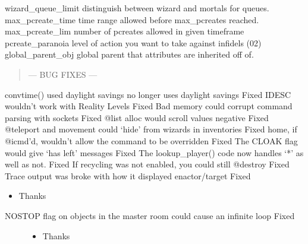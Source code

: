 \documentclass[letterpaper,10pt,english]{sphinxmanual}
\begin{document}
\sphinxAtStartPar
wizard\_queue\_limit \sphinxhyphen{} distinguish between wizard and mortals for queues.
max\_pcreate\_time \sphinxhyphen{} time range allowed before max\_pcreates reached.
max\_pcreate\_lim \sphinxhyphen{} number of pcreates allowed in given timeframe
pcreate\_paranoia \sphinxhyphen{} level of action you want to take against infidels (0\sphinxhyphen{}2)
global\_parent\_obj \sphinxhyphen{} global parent that attributes are inherited off of.
\begin{quote}

\sphinxAtStartPar
— BUG FIXES —
\end{quote}

\sphinxAtStartPar
convtime() used daylight savings \sphinxhyphen{} no longer uses daylight savings \sphinxhyphen{} Fixed
IDESC wouldn’t work with Reality Levels \sphinxhyphen{} Fixed
Bad memory could corrupt command parsing with sockets \sphinxhyphen{} Fixed
@list alloc would scroll values negative \sphinxhyphen{} Fixed
@teleport and movement could ‘hide’ from wizards in inventories \sphinxhyphen{} Fixed
home, if @icmd’d, wouldn’t allow the command to be overridden \sphinxhyphen{} Fixed
The CLOAK flag would give ‘has left’ messages \sphinxhyphen{} Fixed
The lookup\_player() code now handles ‘*’ as well as not. \sphinxhyphen{} Fixed
If recycling was not enabled, you could still @destroy \sphinxhyphen{} Fixed
Trace output was broke with how it displayed enactor/target \sphinxhyphen{} Fixed
\begin{itemize}
\item {} 
\sphinxAtStartPar
Thanks 

\end{itemize}
\begin{description}
\item[{NOSTOP flag on objects in the master room could cause an infinite loop \sphinxhyphen{} Fixed}] \leavevmode\begin{itemize}
\item {} 
\sphinxAtStartPar
Thanks 

\end{itemize}

\end{description}
\end{document}
